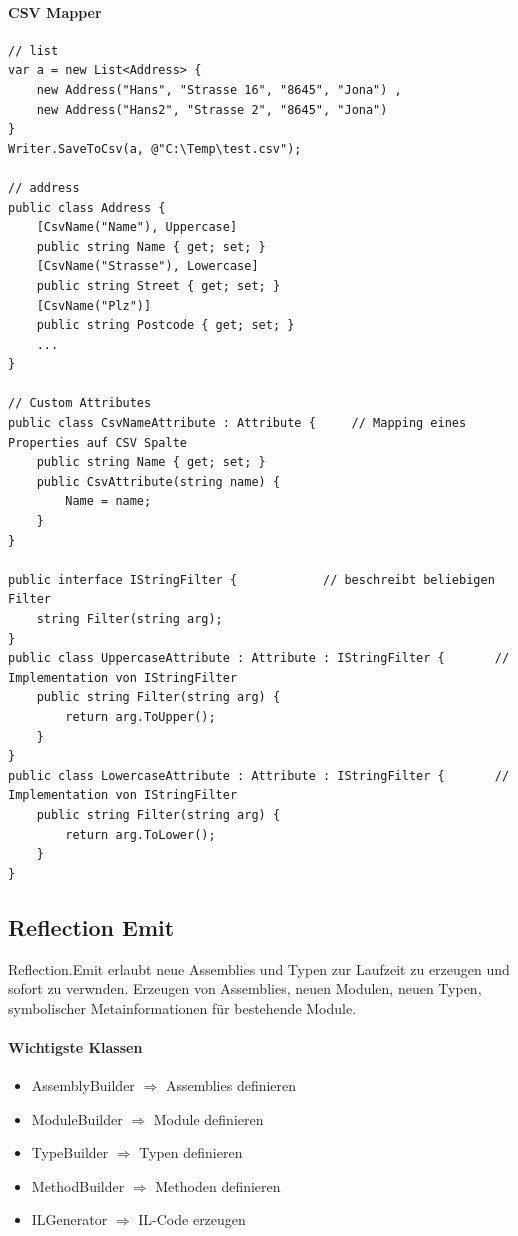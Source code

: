 \documentclass[
a4paper,
oneside,
10pt,
fleqn,
headsepline,
toc=listofnumbered, 
bibliography=totocnumbered]{scrartcl}
\begin{document}
\paragraph{CSV Mapper}
\begin{lstlisting}
// list
var a = new List<Address> {
	new Address("Hans", "Strasse 16", "8645", "Jona") ,
	new Address("Hans2", "Strasse 2", "8645", "Jona")
}
Writer.SaveToCsv(a, @"C:\Temp\test.csv");

// address
public class Address {
	[CsvName("Name"), Uppercase]
	public string Name { get; set; }
	[CsvName("Strasse"), Lowercase]
	public string Street { get; set; }
	[CsvName("Plz")]
	public string Postcode { get; set; }
	...
}

// Custom Attributes
public class CsvNameAttribute : Attribute {     // Mapping eines Properties auf CSV Spalte
	public string Name { get; set; }
	public CsvAttribute(string name) {
		Name = name;
	}
}

public interface IStringFilter {            // beschreibt beliebigen Filter
	string Filter(string arg); 
}
public class UppercaseAttribute : Attribute : IStringFilter {       // Implementation von IStringFilter
	public string Filter(string arg) {
		return arg.ToUpper();
	}
}
public class LowercaseAttribute : Attribute : IStringFilter {       // Implementation von IStringFilter
	public string Filter(string arg) {
		return arg.ToLower();
	}
}
\end{lstlisting}

\subsection{Reflection Emit}
Reflection.Emit erlaubt neue Assemblies und Typen zur Laufzeit zu erzeugen und sofort zu verwnden. Erzeugen von Assemblies, neuen Modulen, neuen Typen, symbolischer Metainformationen für bestehende Module.
\paragraph{Wichtigste Klassen}
\begin{itemize}
	\item AssemblyBuilder $\Rightarrow$ Assemblies definieren
	\item ModuleBuilder $\Rightarrow$ Module definieren
	\item TypeBuilder $\Rightarrow$ Typen definieren
	\item MethodBuilder $\Rightarrow$ Methoden definieren
	\item ILGenerator $\Rightarrow$ IL-Code erzeugen
\end{itemize}
\end{document}

